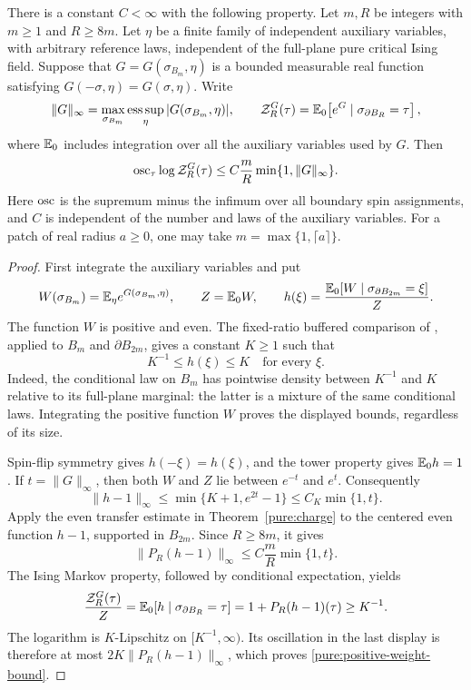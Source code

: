 \begin{lemma}
\label{pure:positive-weight}
There is a constant \(C<\infty\) with the following property.
Let \(m,R\) be integers with \(m\ge1\) and \(R\ge8m\).
Let \(\eta\) be a finite family of independent auxiliary variables,
with arbitrary reference laws, independent of the full-plane pure
critical Ising field. Suppose that \(G=G(\sigma_{B_m},\eta)\) is a bounded measurable
real function satisfying \(G(-\sigma,\eta)=G(\sigma,\eta)\).
Write
\[
 \|G\|_\infty
 =\max_{\sigma_{B_m}}\operatorname*{ess\,sup}_{\eta}
       |G(\sigma_{B_m},\eta)|,
 \qquad
 \mathcal Z_R^G(\tau)
 =\mathbb E_0\!\left[e^G\mid\sigma_{\partial B_R}=\tau\right],
\]
where \(\mathbb E_0\) includes integration over all the auxiliary variables
used by \(G\). Then
\begin{equation}
 \operatorname{osc}_{\tau}\log\mathcal Z_R^G(\tau)
 \le C\frac mR\min\{1,\|G\|_\infty\}.
 \label{pure:positive-weight-bound}
\end{equation}
Here \(\operatorname{osc}\) is the supremum minus the infimum over all boundary
spin assignments, and \(C\) is independent of the number and laws of
the auxiliary variables. For a patch of real radius \(a\ge0\), one
may take \(m=\max\{1,\lceil a\rceil\}\).
\end{lemma}

\begin{proof}
First integrate the auxiliary variables and put
\[
 W(\sigma_{B_m})=\mathbb E_{\eta}e^{G(\sigma_{B_m},\eta)},
 \qquad Z=\mathbb E_0W,
 \qquad
 h(\xi)=\frac{\mathbb E_0[W\mid\sigma_{\partial B_{2m}}=\xi]}{Z}.
\]
The function \(W\) is positive and even. The fixed-ratio buffered
comparison of \cite[Section~2, Proposition ``Buffered and small-patch
comparisons'']{S}, applied to \(B_m\) and \(\partial B_{2m}\), gives
a constant \(K\ge1\) such that
\[
 K^{-1}\le h(\xi)\le K
 \quad\text{for every }\xi.
\]
Indeed, the conditional law on \(B_m\) has pointwise density between
\(K^{-1}\) and \(K\) relative to its full-plane marginal: the latter
is a mixture of the same conditional laws. Integrating the positive
function \(W\) proves the displayed bounds, regardless of its size.

Spin-flip symmetry gives \(h(-\xi)=h(\xi)\), and the tower property
gives \(\mathbb E_0h=1\). If \(t=\|G\|_\infty\), then both \(W\) and
\(Z\) lie between \(e^{-t}\) and \(e^t\). Consequently
\[
 \|h-1\|_\infty
 \le \min\{K+1,e^{2t}-1\}
 \le C_K\min\{1,t\}.
\]
Apply the even transfer estimate in Theorem~\ref{pure:charge} to the
centered even function \(h-1\), supported in \(B_{2m}\). Since
\(R\ge8m\), it gives
\[
 \|P_R(h-1)\|_\infty
 \le C\frac mR\min\{1,t\}.
\]
The Ising Markov property, followed by conditional expectation, yields
\[
 \frac{\mathcal Z_R^G(\tau)}{Z}
 =\mathbb E_0[h\mid\sigma_{\partial B_R}=\tau]
 =1+P_R(h-1)(\tau)\ge K^{-1}.
\]
The logarithm is \(K\)-Lipschitz on \([K^{-1},\infty)\).
Its oscillation in the last display is therefore at most
\(2K\|P_R(h-1)\|_\infty\), which proves
\eqref{pure:positive-weight-bound}.
\end{proof}
